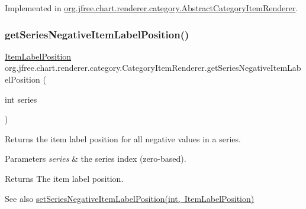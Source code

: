 Implemented in \mbox{\hyperlink{classorg_1_1jfree_1_1chart_1_1renderer_1_1category_1_1_abstract_category_item_renderer_a8281cfcc9d4be151f6ed682f16cca2a3}{org.\+jfree.\+chart.\+renderer.\+category.\+Abstract\+Category\+Item\+Renderer}}.

\mbox{\label{interfaceorg_1_1jfree_1_1chart_1_1renderer_1_1category_1_1_category_item_renderer_a4d25d81d8fd4ce5d4b18f49663039e49}} 
\subsubsection{\texorpdfstring{get\+Series\+Negative\+Item\+Label\+Position()}{getSeriesNegativeItemLabelPosition()}}
{\footnotesize\ttfamily \mbox{\hyperlink{classorg_1_1jfree_1_1chart_1_1labels_1_1_item_label_position}{Item\+Label\+Position}} org.\+jfree.\+chart.\+renderer.\+category.\+Category\+Item\+Renderer.\+get\+Series\+Negative\+Item\+Label\+Position (\begin{DoxyParamCaption}\item[{int}]{series }\end{DoxyParamCaption})}

Returns the item label position for all negative values in a series.


\begin{DoxyParams}{Parameters}
{\em series} & the series index (zero-\/based).\\
\hline
\end{DoxyParams}
\begin{DoxyReturn}{Returns}
The item label position.
\end{DoxyReturn}
\begin{DoxySeeAlso}{See also}
\mbox{\hyperlink{interfaceorg_1_1jfree_1_1chart_1_1renderer_1_1category_1_1_category_item_renderer_ae3201c328eb9526f806b12183f187742}{set\+Series\+Negative\+Item\+Label\+Position(int, Item\+Label\+Position)}} 
\end{DoxySeeAlso}
\mbox{\label{interfaceorg_1_1jfree_1_1chart_1_1renderer_1_1category_1_1_category_item_renderer_a269a247e3438efdbf4f9620751e650e7}} 
